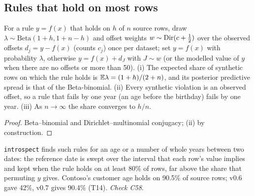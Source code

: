 \subsection{Rules that hold on most rows}
\begin{proposition}\label{prop:soft}
For a rule $y=f(x)$ that holds on $h$ of $n$ source rows, draw $\lambda\sim\mathrm{Beta}(1+h,1+n-h)$ and offset weights $w\sim\operatorname{Dir}(c+\frac12)$ over the observed offsets $d_j=y-f(x)$ (counts $c_j$) once per dataset; set $y=f(x)$ with probability $\lambda$, otherwise $y=f(x)+d_J$ with $J\sim w$ (or the modelled value of $y$ when there are no offsets or more than 50). (i) The expected share of synthetic rows on which the rule holds is $\mathbb{E}\lambda=(1+h)/(2+n)$, and its posterior predictive spread is that of the Beta-binomial. (ii) Every synthetic violation is an observed offset, so a rule that fails by one year (an age before the birthday) fails by one year. (iii) As $n\to\infty$ the share converges to $h/n$.
\end{proposition}
\begin{proof}
Beta--binomial and Dirichlet--multinomial conjugacy; (ii) by construction.
\end{proof}
\noindent \texttt{introspect} finds such rules for an age or a number of whole years between two dates: the reference date is swept over the interval that each row's value implies and kept when the rule holds on at least 80\% of rows, far above the share that permuting $y$ gives. Contoso's customer age holds on 90.5\% of source rows; v0.6 gave 42\%, v0.7 gives 90.4\% (T14). \emph{Check C58}.

